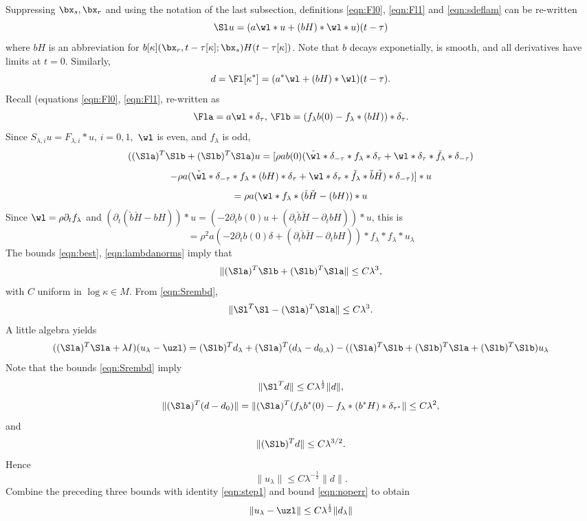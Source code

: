 Suppressing $ \bx_s,\bx_r$ and using the notation of the last
subsection, definitions \ref{eqn:Fl0}, \ref{eqn:Fl1} and
\ref{eqn:sdeflam} can be re-written
\[
  \Sl u = (a \wl*u + (bH) * \wl *u)(t-\tau)
\]
where $bH$ is an abbreviation for
$b[\kappa](\bx_r,t-\tau[\kappa];\bx_s)H(t-\tau[\kappa])$. Note that
$b$ decays exponetially, is smooth, and all derivatives have limits
at $t=0$. Similarly,
\[
  d = \Fl[\kappa^*] = (a^*\wl + (bH)  * \wl) (t-\tau).
\]
Recall (equations \ref{eqn:Fl0}, \ref{eqn:Fl1}, re-written as
\[
\Fla = a \wl * \delta_{\tau}, \,   \Flb  = (f_{\lambda}b(0) -
f_{\lambda}*(bH))*\delta_{\tau}.
\]
Since $S_{\lambda,i} u = F_{\lambda,i} * u, \,i=0,1,$ $\wl$ is even,
and $f_{\lambda}$ is odd,
\[
 ((\Sla)^T \Slb + (\Slb)^T\Sla)u = [\rho a b(0)( \check{\wl} *\delta_{-\tau}*f_{\lambda}*\delta_{\tau} + \wl
 *\delta_{\tau}*\check{f}_{\lambda}*\delta_{-\tau}) 
\]
\[
-
 \rho a(\check{\wl}*\delta_{-\tau} *f_{\lambda}*(bH)*\delta_{\tau} + \wl*\delta_{\tau}*\check{f}_{\lambda}*\check{b}\check{H)}*\delta_{-\tau}) ]*u
\]
\[
  = \rho a(\wl*f_{\lambda}*(\check{b}\check{H}-(bH)) *u
\]
Since $\wl = \rho \partial_t f_{\lambda}$ and $(\partial_t
(\check{b}\check{H}-bH))*u = (-2\partial_tb(0)u + (\partial_t\check{b}\check{H} -\partial_tb H))*u$, this is
\begin{equation}
  \label{eqn:symmprods0s1}
  = \rho^2 a(-2\partial_tb(0) \delta + (\partial_t\check{b}\check{H} -
  \partial_tb H)) * f_{\lambda}*f_{\lambda}*u_{\lambda}
\end{equation}
The bounds \ref{eqn:best}, \ref{eqn:lambdanorms} imply that
\begin{equation}
  \label{eqn:s0s1norm}
  \|(\Sla)^T\Slb + (\Slb)^T\Sla\| \le C \lambda^3,
\end{equation}
with $C$ uniform in $\log \kappa \in M$. From \ref{eqn:Srembd},
\begin{equation}
  \label{eqn:noperr}
  \|\Sl^T\Sl - (\Sla)^T\Sla\| \le C \lambda^3.
\end{equation}
A little algebra yields
\begin{equation}
  \label{eqn:step1}
  ((\Sla)^T\Sla + \lambda I) (u_{\lambda}-\uzl) = (\Slb)^T d_{\lambda} + (\Sla)^T(d_{\lambda}-d_{0,\lambda})- 
  ((\Sla)^T\Slb + (\Slb)^T\Sla + (\Slb)^T\Slb)u_{\lambda}
\end{equation}
Note that the bounds \ref{eqn:Srembd} imply
\[
  \|\Sl^T d\| \le C \lambda^{\frac{1}{2}}\|d\|,
\]
\[
  \|(\Sla)^T (d-d_0)\| = \|(\Sla)^T(f_{\lambda}b^*(0) -
f_{\lambda}*(b^*H)*\delta_{\tau^*}\| \le C \lambda^2,
\]
and
\[
 \| (\Slb)^Td \| \le C \lambda^{3/2}.
\]
Hence
\[
  \|u_{\lambda}\| \le C\lambda^{-\frac{1}{2}}\|d\|.
\]
Combine the preceding three bounds with identity \ref{eqn:step1} and
bound \ref{eqn:noperr} to obtain
\begin{equation}
  \label{eqn:step2}
  \|u_{\lambda}-\uzl\| \le C
  \lambda^{\frac{1}{2}}\|d_{\lambda}\|
\end{equation}

